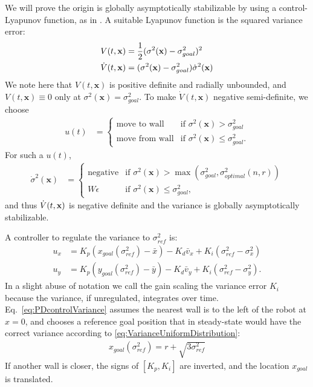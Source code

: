 We will prove the origin is globally asymptotically stabilizable by using a control-Lyapunov function, as in \citet{Lyapunov1992}.  A suitable Lyapunov function is the squared variance error:
\begin{align}
\label{eq:LyapunovVariance}
V(t,\bf{x})  &= \frac{1}{2} (\sigma^2(\mathbf{x}) - \sigma^2_{goal})^2\nonumber\\
\dot{V}(t,\bf{x}) &= (\sigma^2(\mathbf{x})-\sigma^2_{goal})\dot{\sigma}^2(\mathbf{x})
\end{align}
We note here that $V(t,\mathbf{x})$ is positive definite and radially unbounded, and $V(t,\mathbf{x}) \equiv 0$ only at $\sigma^2(\mathbf{x}) = \sigma^2_{goal}$.
To make $\dot{V}(t,\mathbf{x})$ negative semi-definite, we choose
\begin{align}\label{eq:controlVariance}
u(t) &=   \begin{cases}
	 \mbox{move to wall} &\mbox{if } \sigma^2(\mathbf{x})>\sigma^2_{goal} \\ 
	 \mbox{move from wall} & \mbox{if } \sigma^2(\mathbf{x}) \le \sigma^2_{goal}.
\end{cases} 
\end{align}
 For such a $u(t)$,
 \begin{align}
\dot{\sigma}^2(\mathbf{x}) &=   \begin{cases}
	 \mbox{negative} &\mbox{if } \sigma^2(\mathbf{x})> \max(\sigma^2_{goal}, \sigma^2_{optimal}(n,r))  \\ 
	 W \epsilon & \mbox{if } \sigma^2(\mathbf{x}) \le \sigma^2_{goal},
\end{cases} 
\end{align} and thus
$\dot{V}(t,{\bf x})$ is negative definite and the variance is globally asymptotically stabilizable.%



A  controller to regulate the variance to $\sigma^2_{ref}$ is:
\begin{align}
u_x &= K_{p}(x_{goal}(\sigma^2_{ref}) - \bar{x}) - K_{d}\bar{v}_x + K_{i}(\sigma^2_{ref}-\sigma^2_{x}) \nonumber\\
u_y &= K_{p}(y_{goal}(\sigma^2_{ref})  - \bar{y}) - K_{d}\bar{v}_y + K_{i}(\sigma^2_{ref}-\sigma^2_{y}).  \label{eq:PDcontrolVariance}
\end{align}
In a slight abuse of notation we call the gain scaling the variance error $K_i$ because the variance, if unregulated, integrates over time.
Eq.~\eqref{eq:PDcontrolVariance} assumes the nearest wall is to the left of the robot at $x=0$, and chooses a reference goal position that in steady-state would have the correct variance according to \eqref{eq:VarianceUniformDistribution}:
\begin{align}
x_{goal}(\sigma^2_{ref}) = r + \sqrt{3\sigma^2_{ref}}
\end{align}
 If another wall is closer, the signs of $[K_p,K_i]$ are inverted, and the location $x_{goal}$ is translated.  


